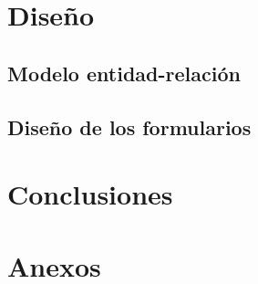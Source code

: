 \documentclass{article}
\begin{document}
\section{Diseño}

\subsection{Modelo entidad-relación}

\subsection{Diseño de los formularios}

\section{Conclusiones}




\newpage

\section{Anexos}
\label{sec:anexos}


\label{doc:ficha-tecnica}



\newpage

\thispagestyle{empty}

\vspace*{0.3\textwidth}

\begin{figure}[h]
  \centering
  
\end{figure}
\end{document}

